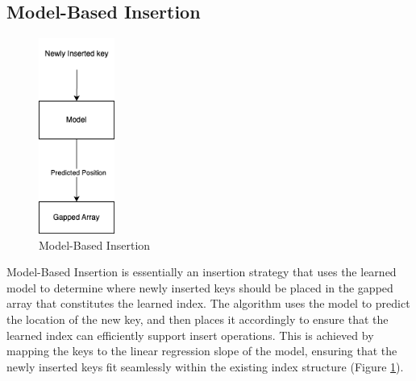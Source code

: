 \documentclass[11pt,a4paper]{article}
\begin{document}
\subsection{Model-Based Insertion}
\begin{figure}
    \centering
    \includegraphics[width=25mm,scale=0.5]{Figures/ModelBasedInsert.png}
    \caption{
     Model-Based Insertion
    }
    \label{fig:model-basedinsertion}
\end{figure}
Model-Based Insertion is essentially an insertion strategy that uses the learned model to determine where newly inserted keys should be placed in the gapped array that constitutes the learned index. The algorithm uses the model to predict the location of the new key, and then places it accordingly to ensure that the learned index can efficiently support insert operations. This is achieved by mapping the keys to the linear regression slope of the model, ensuring that the newly inserted keys fit seamlessly within the existing index structure (Figure \ref{fig:model-basedinsertion}).
\end{document}
